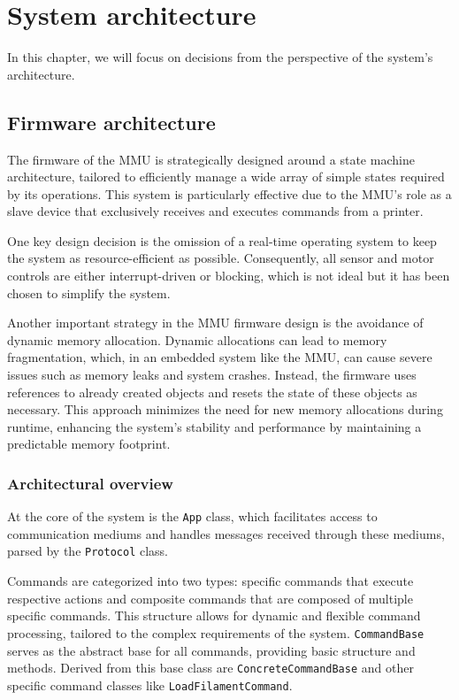 \chapter{System architecture}

In this chapter, we will focus on decisions from the perspective of the system's architecture.

\section{Firmware architecture}

The firmware of the MMU is strategically designed around a state machine architecture, tailored to efficiently manage a wide array of simple states required by its operations. This system is particularly effective due to the MMU's role as a slave device that exclusively receives and executes commands from a printer.

One key design decision is the omission of a real-time operating system to keep the system as resource-efficient as possible. Consequently, all sensor and motor controls are either interrupt-driven or blocking, which is not ideal but it has been chosen to simplify the system.

Another important strategy in the MMU firmware design is the avoidance of dynamic memory allocation. Dynamic allocations can lead to memory fragmentation, which, in an embedded system like the MMU, can cause severe issues such as memory leaks and system crashes. Instead, the firmware uses references to already created objects and resets the state of these objects as necessary. This approach minimizes the need for new memory allocations during runtime, enhancing the system’s stability and performance by maintaining a predictable memory footprint.

\subsection{Architectural overview}

At the core of the system is the \texttt{App} class, which facilitates access to communication mediums and handles messages received through these mediums, parsed by the \texttt{Protocol} class.

Commands are categorized into two types: specific commands that execute respective actions and composite commands that are composed of multiple specific commands. This structure allows for dynamic and flexible command processing, tailored to the complex requirements of the system.
\texttt{CommandBase} serves as the abstract base for all commands, providing basic structure and methods. Derived from this base class are \texttt{ConcreteCommandBase} and other specific command classes like \texttt{LoadFilamentCommand}.

